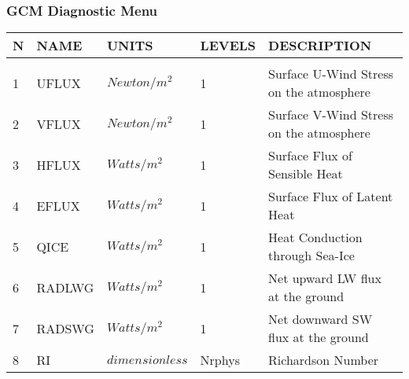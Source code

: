 \newpage

\subsubsection{GCM Diagnostic Menu}
\label{sec:diagnostics:menu}

\begin{tabular}{lllll}
\hline\hline
N & NAME & UNITS & LEVELS & DESCRIPTION \\
\hline

&\\
1 & UFLUX    &   $Newton/m^2$  &    1  
         &\begin{minipage}[t]{3in}
          {Surface U-Wind Stress on the atmosphere}
         \end{minipage}\\
2 & VFLUX    &   $Newton/m^2$  &    1  
         &\begin{minipage}[t]{3in}
          {Surface V-Wind Stress on the atmosphere}
         \end{minipage}\\
3 & HFLUX    &   $Watts/m^2$  &    1  
         &\begin{minipage}[t]{3in}
          {Surface Flux of Sensible Heat}
         \end{minipage}\\
4 & EFLUX    &   $Watts/m^2$  &    1  
         &\begin{minipage}[t]{3in}
          {Surface Flux of Latent Heat}
         \end{minipage}\\
5 & QICE     &   $Watts/m^2$  &    1  
         &\begin{minipage}[t]{3in}
          {Heat Conduction through Sea-Ice}
         \end{minipage}\\
6 & RADLWG   &   $Watts/m^2$ &    1  
         &\begin{minipage}[t]{3in}
          {Net upward LW flux at the ground}
         \end{minipage}\\
7 & RADSWG   &   $Watts/m^2$  &    1 
         &\begin{minipage}[t]{3in}
          {Net downward SW flux at the ground} 
         \end{minipage}\\
8 & RI       &  $dimensionless$ &  Nrphys 
         &\begin{minipage}[t]{3in}
          {Richardson Number}
         \end{minipage}\\

\end{tabular}

